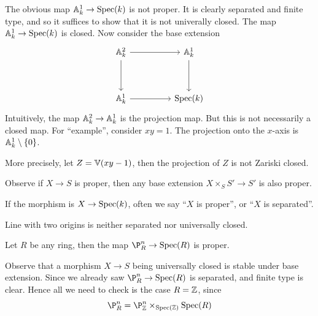 \documentclass{article}
\begin{document}
\begin{example}
     The obvious map \(\mathbb{A}_{k}^{1} \to \operatorname{Spec}(k)\) is not proper. It is clearly separated and finite type, and so it suffices to show that it is not univerally closed. The map \(\mathbb{A}_{k}^{1} \to \operatorname{Spec}(k)\) is closed. Now consider the base extension
    \[\begin{tikzcd}
        {\aff k2} && {\aff k1} \\
        \\
        {\aff k 1} && {\Spec(k)}
        \arrow[from=1-1, to=3-1]
        \arrow[from=1-1, to=1-3]
        \arrow[from=1-3, to=3-3]
        \arrow[from=3-1, to=3-3]
    \end{tikzcd}\]
    Intuitively, the map \(\mathbb{A}_{k}^{2} \to \mathbb{A}_{k}^{1}\) is the projection map. But this is not necessarily a closed map. For ``example'', consider \(xy = 1\). The projection onto the \(x\)-axis is \(\mathbb{A}_{k}^{1} \setminus \{0\}\).

    More precisely, let \(Z = \mathbb{V}(xy - 1)\), then the projection of \(Z\) is not Zariski closed.
\end{example}

Observe if \(X \to S\) is proper, then any base extension \(X \times_S S' \to S'\) is also proper.

\lec

\begin{notation}
    If the morphism is \(X \to \operatorname{Spec}(k)\), often we say ``\(X\) is proper'', or ``\(X\) is separated''.
\end{notation}

\begin{example}
    Line with two origins is neither separated nor universally closed.
\end{example}

\begin{proposition}
    Let \(R\) be any ring, then the map \(\P^n_R \to \Spec(R)\) is proper.
\end{proposition}

Observe that a morphism \(X \to S\) being universally closed is stable under base extension. Since we already saw \(\P^n_R \to \Spec(R)\) is separated, and finite type is clear. Hence all we need to check is the case \(R = \mathbb{Z}\), since
\[\P^n_R = \P^n_\Z \times_{\Spec(\Z)} \Spec(R)\] 
\end{document}

